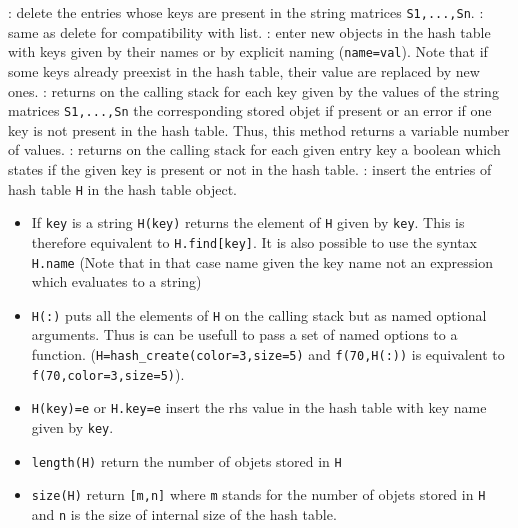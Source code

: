   \begin{varlist}
  : delete the entries whose keys are present in the string matrices 
  \verb+S1,...,Sn+.
  : same as delete for compatibility with list.
  : enter new objects in the hash table with keys 
  given by their names or by explicit naming (\verb+name=val+). Note that if some keys 
  already preexist in the hash table, their value are replaced by new ones. 
  : returns on the calling stack for each key given by the values of 
  the string matrices \verb+S1,...,Sn+ the corresponding stored objet if present or an 
  error if one key is not present in the hash table. Thus, this method returns a variable 
  number of values. 
  : returns on the calling stack for each given entry key a boolean 
  which states if the given key is present or not in the hash table.
  : insert the entries of hash table \verb+H+ in the hash table object.
  \end{varlist}

\begin{itemize}
\item If \verb+key+ is a string \verb+H(key)+ returns the element of \verb+H+ given by \verb+key+. 
  This is therefore equivalent to \verb+H.find[key]+. It is also possible to use 
  the syntax \verb+H.name+ (Note that in that case name given the key name not an expression 
  which evaluates to a string) 
\item \verb+H(:)+ puts all the elements of \verb+H+ on the calling stack but as named 
  optional arguments. Thus is can be usefull to pass a set of named options to a function. 
  (\verb+H=hash_create(color=3,size=5)+ and \verb+f(70,H(:))+ is equivalent to 
  \verb+f(70,color=3,size=5)+).
\item \verb+H(key)=e+ or \verb+H.key=e+ insert the rhs value in the hash table with key name 
  given by \verb+key+.
\end{itemize}

\begin{itemize}
   \item \verb+length(H)+ return the number of objets stored in \verb+H+
   \item \verb+size(H)+ return \verb+[m,n]+ where \verb+m+ stands for the number 
     of objets stored in \verb+H+ and \verb+n+ is the size of internal size of 
     the hash table. 
\end{itemize}

